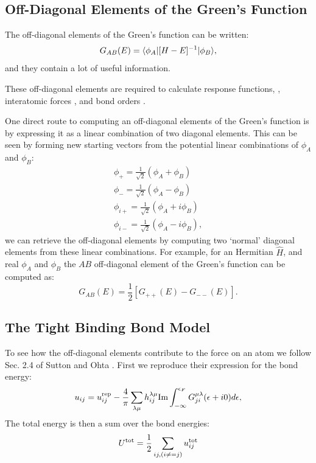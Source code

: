 \subsection{Off-Diagonal Elements of the Green's Function}
The off-diagonal elements of the Green's function can be written:
%
\begin{equation}
G_{AB}(E) = \langle \phi_{A}|[H-E]^{-1}|\phi_{B}\rangle,
\end{equation}
%
and they contain a lot of useful information. 

These off-diagonal elements are required to calculate 
response functions, \cite{terakura78}, interatomic 
forces \cite{finnis84, finnis87, ohta87}, and bond orders 
\cite{coulson39,tersoff86,pettifor89}.

One direct route to computing an off-diagonal elements of the Green's function
is by expressing it as a linear combination of two diagonal elements. 
This can be seen by forming new starting vectors 
from the potential linear combinations of $\phi_{A}$ and $\phi_{B}$:
%
\begin{align}
\phi_{+} = \frac{1}{\sqrt{2}}(\phi_{A} + \phi_{B})\\
\phi_{-} = \frac{1}{\sqrt{2}}(\phi_{A} - \phi_{B})\\
\phi_{i+} = \frac{1}{\sqrt{2}}(\phi_{A} + i\phi_{B})\\
\phi_{i-} = \frac{1}{\sqrt{2}}(\phi_{A} - i\phi_{B}),
\end{align}
%
we can retrieve the off-diagonal elements by computing 
two `normal' diagonal elements from these linear combinations.
For example, for an Hermitian $\hat{H}$, and real $\phi_{A}$ and $\phi_{B}$ 
the $AB$ off-diagonal element of the Green's function can be computed as:
%
\begin{equation}
\label{eq:offdiaggreen}
G_{AB}(E) = \frac{1}{2}[G_{++}(E)-G_{--}(E)].
\end{equation}

\subsection{The Tight Binding Bond Model}
\label{sec:tbbm}
To see how the off-diagonal elements contribute to the force on an 
atom we follow Sec. 2.4 of Sutton \cite{sutton88} and Ohta \cite{ohta87}.
First we reproduce their expression for the bond energy:
%
\begin{equation}
\label{eq:tbenergy}
u_{ij} = u^{\rm rep}_{ij} - \frac{4}{\pi}\sum_{\lambda\mu} 
h_{ij}^{\lambda\mu}{\rm Im}\int_{-\infty}^{\epsilon_{F}}G_{ji}^{\mu\lambda}(\epsilon+i0)d\epsilon,
\end{equation}
%
The total energy is then a sum over the bond energies:
%
\begin{equation}
\label{eq:tbtoten}
U^{\rm tot} = \frac{1}{2}\sum_{ij,(i\neq=j)}u^{\rm tot}_{ij}
\end{equation}
%

